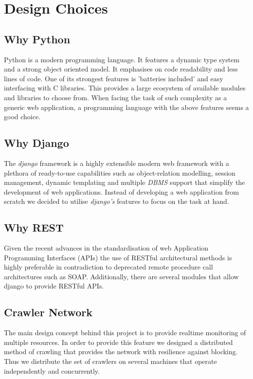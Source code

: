 \chapter{Design Choices}
    \section{Why Python}
        Python is a modern programming language. It features a dynamic type
        system and a strong object oriented model. It emphasises on code
        readability and less lines of code. One of its strongest features is
        'batteries included' and easy interfacing with C libraries. This
        provides a large ecosystem of available modules and libraries to
        choose from. When facing the task of such complexity as a generic web
        application, a programming language with the above features seems a
        good choice.
    \section{Why Django}
        The \emph{django} framework is a highly extensible modern web
        framework with a plethora of ready-to-use capabilities such as
        object-relation modelling, session management, dynamic templating and
        multiple \emph{DBMS} support that simplify the development of web
        applications. Instead of developing a web application from scratch we
        decided to utilise \emph{django's} features to focus on the task at
        hand.
    \section{Why REST}
        Given the recent advances in the standardisation of web Application
        Programming Interfaces (APIs) the use of RESTful architectural methods
        is highly preferable in contradiction to deprecated remote procedure
        call architectures such as SOAP. Additionally, there are several
        modules that allow django to provide RESTful APIs.
    \section{Crawler Network}
        The main design concept behind this project is to provide realtime
        monitoring of multiple resources. In order to provide this feature we
        designed a distributed method of crawling that provides the network
        with resilience against blocking. Thus we distribute the set of
        crawlers on several machines that operate independently and
        concurrently.
